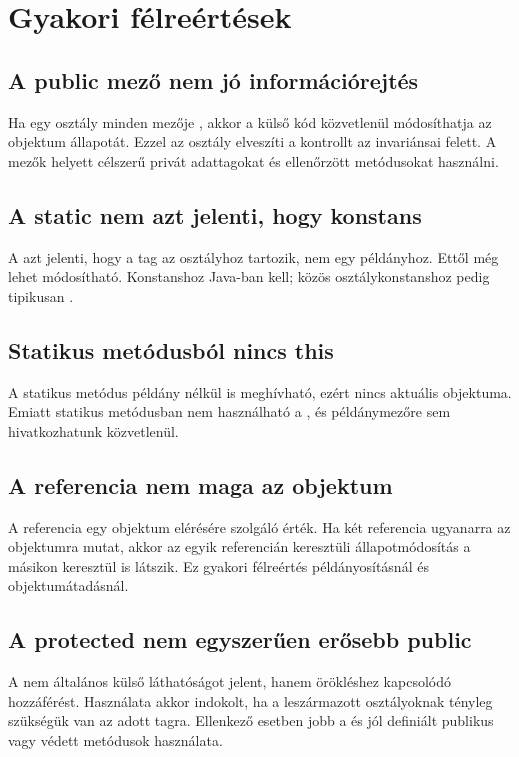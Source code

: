 \section{Gyakori félreértések}

\subsection{A public mező nem jó információrejtés}

Ha egy osztály minden mezője , akkor a külső kód közvetlenül módosíthatja az objektum állapotát. Ezzel az osztály elveszíti a kontrollt az invariánsai felett. A mezők helyett célszerű privát adattagokat és ellenőrzött metódusokat használni.

\subsection{A static nem azt jelenti, hogy konstans}

A  azt jelenti, hogy a tag az osztályhoz tartozik, nem egy példányhoz. Ettől még lehet módosítható. Konstanshoz Java-ban  kell; közös osztálykonstanshoz pedig tipikusan .

\subsection{Statikus metódusból nincs this}

A statikus metódus példány nélkül is meghívható, ezért nincs aktuális objektuma. Emiatt statikus metódusban nem használható a , és példánymezőre sem hivatkozhatunk közvetlenül.

\subsection{A referencia nem maga az objektum}

A referencia egy objektum elérésére szolgáló érték. Ha két referencia ugyanarra az objektumra mutat, akkor az egyik referencián keresztüli állapotmódosítás a másikon keresztül is látszik. Ez gyakori félreértés példányosításnál és objektumátadásnál.

\subsection{A protected nem egyszerűen erősebb public}

A  nem általános külső láthatóságot jelent, hanem örökléshez kapcsolódó hozzáférést. Használata akkor indokolt, ha a leszármazott osztályoknak tényleg szükségük van az adott tagra. Ellenkező esetben jobb a  és jól definiált publikus vagy védett metódusok használata.

